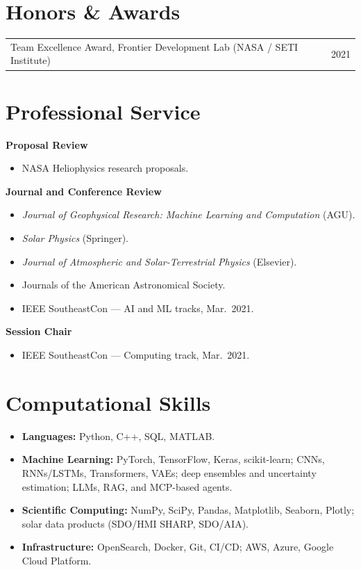 \documentclass[11pt,letterpaper]{article}
\makeatletter
\newcommand{\daterow}[2]{%
  \noindent\begin{tabularx}{\textwidth}{@{}X r@{}}#1 & #2\end{tabularx}\par
}
\makeatother
\begin{document}
\section{Honors \& Awards}
\daterow{Team Excellence Award, Frontier Development Lab (NASA / SETI Institute)}{2021}

\section{Professional Service}
\textbf{Proposal Review}
\begin{itemize}
  \item NASA Heliophysics research proposals.
\end{itemize}
\textbf{Journal and Conference Review}
\begin{itemize}
  \item \textit{Journal of Geophysical Research: Machine Learning and Computation} (AGU).
  \item \textit{Solar Physics} (Springer).
  \item \textit{Journal of Atmospheric and Solar-Terrestrial Physics} (Elsevier).
  \item Journals of the American Astronomical Society.
  \item IEEE SoutheastCon --- AI and ML tracks, Mar.~2021.
\end{itemize}
\textbf{Session Chair}
\begin{itemize}
  \item IEEE SoutheastCon --- Computing track, Mar.~2021.
\end{itemize}

\section{Computational Skills}
\begin{itemize}
  \item \textbf{Languages:} Python, C++, SQL, MATLAB.
  \item \textbf{Machine Learning:} PyTorch, TensorFlow, Keras, scikit-learn; CNNs, RNNs/LSTMs, Transformers, VAEs; deep ensembles and uncertainty estimation; LLMs, RAG, and MCP-based agents.
  \item \textbf{Scientific Computing:} NumPy, SciPy, Pandas, Matplotlib, Seaborn, Plotly; solar data products (SDO/HMI SHARP, SDO/AIA).
  \item \textbf{Infrastructure:} OpenSearch, Docker, Git, CI/CD; AWS, Azure, Google Cloud Platform.
\end{itemize}
\end{document}
